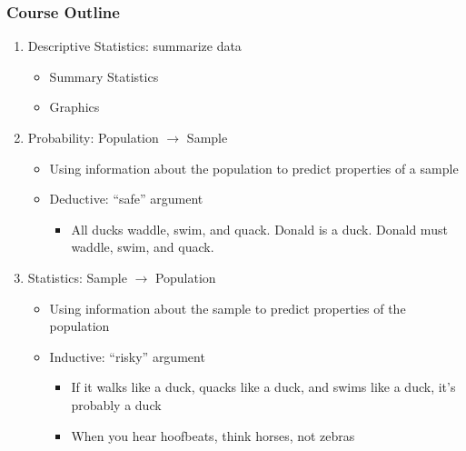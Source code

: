 \documentclass{beamer}
\begin{document}
\begin{frame}
\frametitle{Course Outline}
	\begin{enumerate}
		\item Descriptive Statistics: summarize data
			\begin{itemize}
				\item Summary Statistics
				\item Graphics
			\end{itemize}
		\item Probability: Population $\rightarrow$ Sample
			\begin{itemize}
				\item Using information about the population to predict properties of a sample
				\item Deductive: ``safe'' argument
					\begin{itemize}
						\item All ducks waddle, swim, and quack. Donald is a duck. Donald must 								waddle, swim, and quack.
					\end{itemize}
			\end{itemize}
		\item Statistics: Sample $\rightarrow$ Population
			\begin{itemize}
				\item Using information about the sample to predict properties of the population
				\item Inductive: ``risky'' argument
					\begin{itemize}
						\item If it walks like a duck, quacks like a duck, and swims like a duck, it's 							probably a duck
						\item When you hear hoofbeats, think horses, not zebras
					\end{itemize}
			 \end{itemize}
	\end{enumerate}
\end{frame}
\end{document}
